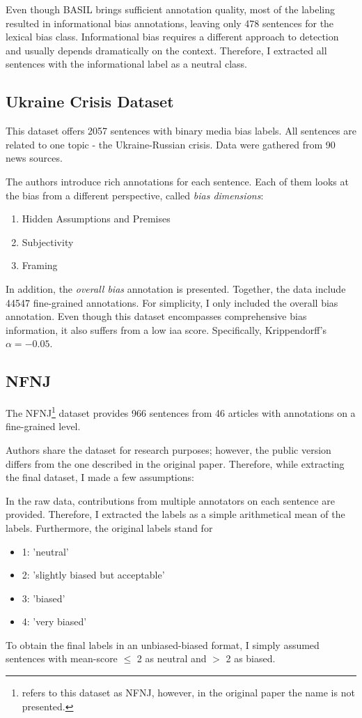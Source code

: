 Even though BASIL brings sufficient annotation quality, most of the labeling resulted in informational bias annotations, leaving only 478 sentences for the lexical bias class. Informational bias requires a different approach to detection \cite{van2020context} and usually depends dramatically on the context. Therefore, I extracted all sentences with the informational label as a neutral class.




\subsection{Ukraine Crisis Dataset}
This dataset \cite{farber2020multidimensional} offers 2057 sentences with binary media bias labels. All sentences are related to one topic - the Ukraine-Russian crisis. Data were gathered from 90 news sources.

The authors introduce rich annotations for each sentence. Each of them looks at the bias from a different perspective, called \textit{bias dimensions}:
\begin{enumerate}
    \item Hidden Assumptions and Premises
    \item Subjectivity
    \item Framing
\end{enumerate}
In addition, the \textit{overall bias} annotation is presented. Together, the data include 44547 fine-grained annotations. For simplicity, I only included the overall bias annotation.
Even though this dataset encompasses comprehensive bias information, it also suffers from a low \Gls{iaa} score. Specifically, Krippendorff’s $\alpha = -0.05$.



\subsection{NFNJ}
The NFNJ\footnote{\cite{farber2020multidimensional} refers to this dataset as NFNJ, however, in the original paper the name is not presented.} dataset provides 966 sentences from 46 articles with annotations on a fine-grained level.

Authors share the dataset for research purposes; however, the public version differs from the one described in the original paper. Therefore, while extracting the final dataset, I made a few assumptions:

In the raw data, contributions from multiple annotators on each sentence are provided. Therefore, I extracted the labels as a simple arithmetical mean of the labels. Furthermore, the original labels stand for 
\begin{itemize}
    \item 1: 'neutral'
    \item 2: 'slightly biased but acceptable'
    \item 3: 'biased'
    \item 4: 'very biased'
\end{itemize}
To obtain the final labels in an unbiased-biased format, I simply assumed sentences with mean-score $\leq$ 2 as neutral and $>$ 2 as biased.

